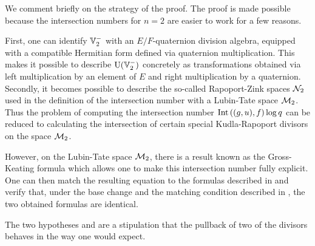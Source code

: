 We comment briefly on the strategy of the proof.
The proof is made possible because the intersection numbers for $n=2$
are easier to work for a few reasons.
\begin{itemize}
\ii First, one can identify $\mathbb V_2^-$ with an $E/F$-quaternion division algebra,
equipped with a compatible Hermitian form defined via quaternion multiplication.
This makes it possible to describe $\operatorname{U}(\mathbb V_2^-)$ concretely as transformations obtained
via left multiplication by an element of $E$ and right multiplication by a quaternion.
\ii Secondly, it becomes possible to describe the so-called Rapoport-Zink spaces $\mathcal N_2$
used in the definition of the intersection number with a Lubin-Tate space $\mathcal M_2$.
Thus the problem of computing the intersection number
$\operatorname{Int}\left( (g,u), f \right) \log q$
can be reduced to calculating the intersection of certain special
Kudla-Rapoport divisors on the space $\mathcal M_2$.

However, on the Lubin-Tate space $\mathcal M_2$,
there is a result known as the Gross-Keating formula \cite{ref:GK}
which allows one to make this intersection number fully explicit.
One can then match the resulting equation to the formulas described in
and verify that, under the base change 
and the matching condition described in ,
the two obtained formulas are identical.
\end{itemize}
The two hypotheses  and 
are a stipulation that the pullback of two of the divisors
behaves in the way one would expect.

